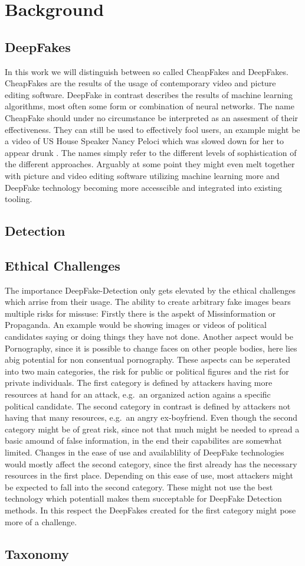 \section{Background}
\subsection{DeepFakes}
In this work we will distinguish between so called CheapFakes and DeepFakes.
CheapFakes are the results of the usage of contemporary video and picture editing software.
DeepFake in contrast describes the results of machine learning algorithms, most 
often some form or combination of neural networks.
The name CheapFake should under no circumstance be interpreted as an assesment of
their effectiveness.
They can still be used to effectively fool users, an example might be a video
of US House Speaker Nancy Peloci which was slowed down for her to appear drunk .
The names simply refer to the different levels of sophistication of the different approaches.
Arguably at some point they might even melt together with picture and video editing software
utilizing machine learning more and DeepFake technology becoming more accesscible and integrated
into existing tooling.
\subsection{Detection}
\subsection{Ethical Challenges}
The importance DeepFake-Detection only gets elevated by the ethical challenges 
which arrise from their usage.
The ability to create arbitrary fake images bears multiple risks for missuse:
Firstly there is the aspekt of Missinformation or Propaganda. 
An example would be showing images or videos of political candidates saying or
doing things they have not done.
Another aspect would be Pornography, since it is possible to change faces on 
other people bodies, here lies abig potential for non consentual pornography.
These aspects can be seperated into two main categories, the risk for public or
political figures and the rist for private individuals.
The first category is defined by attackers having more resources at hand for an
attack, e.g.\ an organized action agains a specific political candidate.
The second category in contrast is defined by attackers not having that many
resources, e.g.\ an angry ex-boyfriend.
Even though the second category might be of great risk, since not that much 
might be needed to spread a basic amound of false information, in the end their
capabilites are somewhat limited.
Changes in the ease of use and availablility of DeepFake technologies would 
mostly affect the second category,
since the first already has the necessary resources in the first place.
Depending on this ease of use, most attackers might be expected to fall into the
second category.
These might not use the best technology which potentiall makes them succeptable
for DeepFake Detection methods.
In this respect the DeepFakes created for the first category might pose more of
a challenge.
 
\subsection{Taxonomy}
